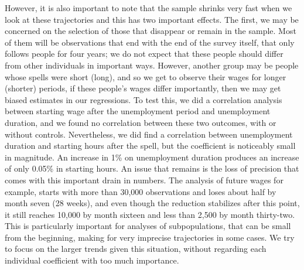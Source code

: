 \documentclass{article}
\begin{document}
However, it is also important to note that the sample shrinks very fast when we look at these trajectories and this has two important effects. The first, we may be concerned on the selection of those that disappear or remain in the sample. Most of them will be observations that end with the end of the survey itself, that only follows people for four years; we do not expect that these people should differ from other individuals in important ways. However, another group may be people whose spells were short (long), and so we get to observe their wages for longer (shorter) periods, if these people's wages differ importantly, then we may get biased estimates in our regressions. To test this, we did a correlation analysis between starting wage after the unemployment period and unemployment duration, and we found no correlation between these two outcomes, with or without controls. Nevertheless, we did find a correlation between unemployment duration and starting hours after the spell, but the coefficient is noticeably small in magnitude. An increase in 1\% on unemployment duration produces an increase of only 0.05\% in starting hours. An issue that remains is the loss of precision that comes with this important drain in numbers. The analysis of future wages for example, starts with more than 30,000 observations and loses about half by month seven (28 weeks), and even though the reduction stabilizes after this point, it still reaches 10,000 by month sixteen and less than 2,500 by month thirty-two. This is particularly important for analyses of subpopulations, that can be small from the beginning, making for very imprecise trajectories in some cases. We try to focus on the larger trends given this situation, without regarding each individual coefficient with too much importance.
\end{document}
